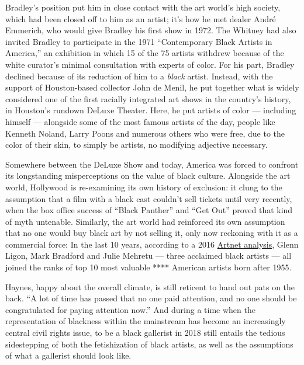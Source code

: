 Bradley's position put him in close contact with the art world's high
society, which had been closed off to him as an artist; it's how he met
dealer André Emmerich, who would give Bradley his first show in 1972.
The Whitney had also invited Bradley to participate in the 1971
``Contemporary Black Artists in America,'' an exhibition in which 15 of
the 75 artists withdrew because of the white curator's minimal
consultation with experts of color. For his part, Bradley declined
because of its reduction of him to a \emph{black} artist. Instead, with
the support of Houston-based collector John de Menil, he put together
what is widely considered one of the first racially integrated art shows
in the country's history, in Houston's rundown DeLuxe Theater. Here, he
put artists of color --- including himself --- alongside some of the
most famous artists of the day, people like Kenneth Noland, Larry Poons
and numerous others who were free, due to the color of their skin, to
simply be artists, no modifying adjective necessary.

Somewhere between the DeLuxe Show and today, America was forced to
confront its longstanding misperceptions on the value of black culture.
Alongside the art world, Hollywood is re-examining its own history of
exclusion: it clung to the assumption that a film with a black cast
couldn't sell tickets until very recently, when the box office success
of ``Black Panther'' and ``Get Out'' proved that kind of myth untenable.
Similarly, the art world had reinforced its own assumption that no one
would buy black art by not selling it, only now reckoning with it as a
commercial force: In the last 10 years, according to a 2016
\href{https://news.artnet.com/market/racial-bias-art-auction-market-672518}{Artnet
analysis}, Glenn Ligon, Mark Bradford and Julie Mehretu --- three
acclaimed black artists --- all joined the ranks of top 10 most valuable
**** American artists born after 1955.

Haynes, happy about the overall climate, is still reticent to hand out
pats on the back. ``A lot of time has passed that no one paid attention,
and no one should be congratulated for paying attention now.'' And
during a time when the representation of blackness within the mainstream
has become an increasingly central civil rights issue, to be a black
gallerist in 2018 still entails the tedious sidestepping of both the
fetishization of black artists, as well as the assumptions of what a
gallerist should look like.

